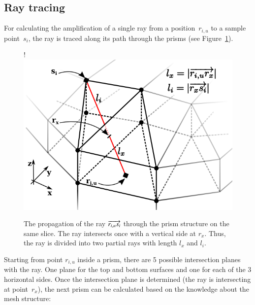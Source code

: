 \subsection{Ray tracing} \label{subsec:raytracing}
For calculating the amplification of a single ray from a position~$r_{i,u}$ to a sample
point~$s_i$, the ray is traced along its path through the prisms (see Figure~\ref{graphic:prism_propagation}). 

\begin{figure}[H]
  \centerline{
     {!} {\includegraphics{./graphics/prism_propagation_4.png}}
  }


  \caption{The propagation of the ray
    $\protect\overrightarrow{r_{i,u}s_i}$ through the prism
    structure on the same slice. The ray intersects once with a
    vertical side at $r_x$. Thus, the ray is divided into two
    partial rays with length $l_x$ and $l_i$.}
  \label{graphic:prism_propagation}
\end{figure}
Starting from point $r_{i,u}$ inside a prism, there are 5 possible intersection
planes with the ray. One plane for the top and bottom surfaces and one for each
of the 3 horizontal sides. Once the intersection plane is determined (the ray is
intersecting at point~$r_x$), the next prism can be calculated based on the
knowledge about the mesh structure:


